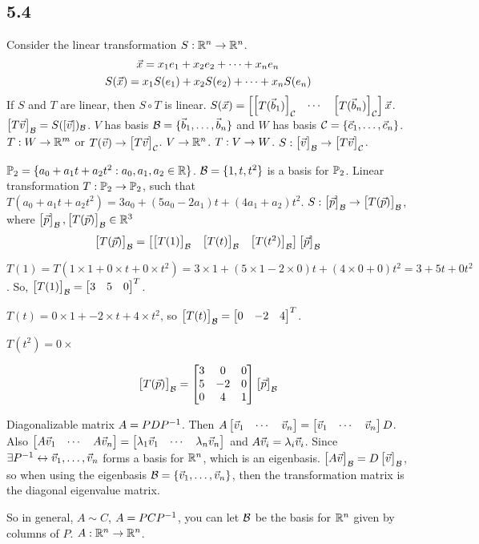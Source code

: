 \documentclass[10pt,a4paper]{article}
\begin{document}
\subsection{5.4}
Consider the linear transformation $S:\mb{R}^n \ra \mb{R}^n$.
$$\vx = x_1 e_1 + x_2 e_2 + \cdots + x_n e_n$$
$$S(\vx) = x_1 S(e_1) + x_2 S(e_2) + \cdots + x_n S(e_n)$$
If $S$ and $T$ are linear, then $S\circ T$ is linear.
$S(\vx) = \mat{\mat{T(\vb_1)}_\mc C & \cdots & \mat{T(\vb_n)}_\mc C} \vx$.
$\mat{T\vv}_\mc B = S([\vv])_\mc B$.
$V$ has basis $\mc B = \{\vb_1,\dots,\vb_n\}$ and $W$ has basis $\mc C = \{\vc_1,\dots,\vc_n\}$. $T:W \ra \mb{R}^m$ or $T(\vv) \ra \mat{T\vv}_\mc C$. $V \ra \mb{R}^n$. $T:V\ra W$. $S:\mat{\vv}_\mc B \ra \mat{T\vv}_\mc C$.
\begin{example}
	$\mb{P}_2 = \{a_0+a_1 t + a_2 t^2:a_0,a_1,a_2 \in \mb{R}\}$.
	$\mc B = \{1,t,t^2\}$ is a basis for $\mb{P}_2$.
	Linear transformation $T:\mb{P}_2 \ra \mb{P}_2$, such that $T(a_0 + a_1 t + a_2 t^2) = 3a_0 + (5a_0 - 2a_1)t + (4a_1 + a_2)t^2$.
	$S:\mat{\vp}_\mc B \ra \mat{T(\vp)}_\mc B$, where $\mat{\vp}_\mc B,\mat{T(\vp)}_\mc B \in \mb{R}^3$
	$$\mat{T(\vp)}_\mc B = \mat{\mat{T(1)}_\mc B & \mat{T(t)}_\mc B & \mat{T(t^2)}_\mc B}\mat{\vp}_\mc B$$
	
	$T(1) = T(1\times 1 + 0\times t + 0\times t^2) = 3\times 1 + (5\times 1 - 2\times 0)t + (4\times 0 + 0)t^2 = 3+5t+0t^2$. So, $\mat{T(1)}_\mc B = \mat{3 & 5 & 0}^T$.
	
	$T(t) = 0\times 1 + -2 \times t + 4 \times t^2$, so $\mat{T(t)}_\mc B = \mat{0&-2&4}^T$.
	
	$T(t^2) = 0\times $
	
	$$\mat{T(\vp)}_\mc B = \mat{3 & 0 & 0 \\ 5 & -2 & 0 \\ 0 & 4 & 1}\mat{\vp}_\mc B$$
	
	Diagonalizable matrix $A = PDP\inv$. Then $A\mat{\vv_1 & \cdots & \vv_n} = \mat{\vv_1 & \cdots & \vv_n}D$. Also $\mat{A\vv_1 & \cdots & A\vv_n} = \mat{\lambda_1 \vv_1 & \cdots & \lambda_n \vv_n}$ and $A\vv_i = \lambda_i \vv_i$. Since $\exists P\inv \leftrightarrow \vv_1, \dots, \vv_n$ forms a basis for $\mb{R}^n$, which is an eigenbasis.
	$\mat{A\vv}_\mc B = D \mat{\vv}_\mc B$, so when using the eigenbasis $\mc B = \{\vv_1,\dots,\vv_n\}$, then the transformation matrix is the diagonal eigenvalue matrix.
	
	So in general, $A\sim C$, $A=PCP\inv$, you can let $\mc B$ be the basis for $\mb{R}^n$ given by columns of $P$. $A:\mb{R}^n \ra \mb{R}^n$.
\end{example}
\end{document}

